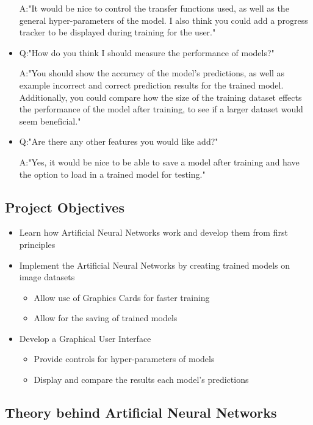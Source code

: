 \documentclass[./project-report/src/latex/project-report.tex]{subfiles}
\begin{document}
\begin{itemize}
          A:"It would be nice to control the transfer functions used, as well as the general hyper-parameters of the model. I also think you could add a progress tracker 
             to be displayed during training for the user."
    \item Q:"How do you think I should measure the performance of models?"

          A:"You should show the accuracy of the model's predictions, as well as example incorrect and correct prediction results for the trained model. Additionally, 
             you could compare how the size of the training dataset effects the performance of the model after training, to see if a larger dataset would seem 
             beneficial."
    \item Q:"Are there any other features you would like add?"

          A:"Yes, it would be nice to be able to save a model after training and have the option to load in a trained model for testing."
\end{itemize}

\subsection{Project Objectives}

\begin{itemize}
    \item Learn how Artificial Neural Networks work and develop them from first principles
    \item Implement the Artificial Neural Networks by creating trained models on image datasets
    \begin{itemize}
        \item Allow use of Graphics Cards for faster training
        \item Allow for the saving of trained models
    \end{itemize}
    \item Develop a Graphical User Interface
    \begin{itemize}
        \item Provide controls for hyper-parameters of models
        \item Display and compare the results each model's predictions
    \end{itemize}
\end{itemize}

\subsection{Theory behind Artificial Neural Networks}
\end{document}
